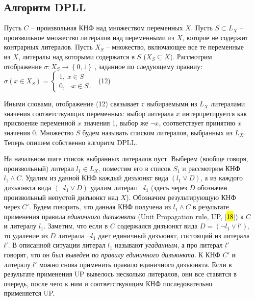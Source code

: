 \subsection{Алгоритм DPLL}

Пусть $C$ -- произвольная КНФ над множеством переменных $X$. Пусть $S \subset L_{X}$ -- произвольное множество литералов над переменными из $X$, которое не содержит контрарных литералов. Пусть $X_{S}$ -- множество, включающее все те переменные из $X$, литералы над которыми содержатся в $S$ ($X_{S} \subseteq X$). Рассмотрим отображение
$\sigma \colon X_{S} \to \left\{ 0,1 \right\}\ $,
заданное по следующему правилу:
\(
    \sigma\left( x \in X_{S} \right) = \left\{ \begin{array}{r}
    1,\ x \in S\ \ \ \ \  \\
    0,\ \neg x \in S\ .
    \end{array} \right.\
\) (12)

Иными словами, отображение (12) связывает с выбираемыми из $L_{X}$ литералами значения соответствующих переменных: выбор литерала $x$ интерпретируется как присвоение переменной $x$ значения 1, выбор же $\neg x$, соответствует принятию $x$ значения 0. Множество $S$ будем называть списком литералов, выбранных из $L_{X}$. Теперь опишем собственно алгоритм DPLL.

На начальном шаге список выбранных литералов пуст. Выберем (вообще говоря, произвольный) литерал $l_{1} \in L_{X}$, поместим его в список $S_{1}$ и рассмотрим КНФ $l_{1} \land C$. Удалим из данной КНФ каждый дизъюнкт вида $\left( l_{1} \lor D \right)$, а из каждого дизъюнкта вида $\left( \neg l_{1} \lor D \right)$ удалим литерал $\neg l_{1}$ (здесь через $D$ обозначен произвольный непустой дизъюнкт над $X$). Обозначим результирующую КНФ через $C'$. Будем говорить, что данная КНФ получена из $l_{1} \land C$ в результате применения правила \textit{единичного дизъюнкта} (Unit Propagation rule, UP, {[}\hl{18}{]}) к $C$ и литералу $l_{1}$. Заметим, что если в $C$ содержался дизъюнкт вида $D = \left( \neg l_{1} \lor l' \right)$, то удаление из $D$ литерала $\neg l_{1}$ дает единичный дизъюнкт, состоящий из литерала $l'$. В описанной ситуации литерал $l_{1}$ называют \textit{угаданным}, а про литерал $l'$ говорят, что он был \textit{выведен по правилу единичного дизъюнкта}. К КНФ $C'$ и литералу $l'$ можно снова применить правило единичного дизъюнкта. Если в результате применения UP вывелось несколько литералов, они все ставятся в очередь, после чего к ним и соответствующим КНФ последовательно применяется UP.


